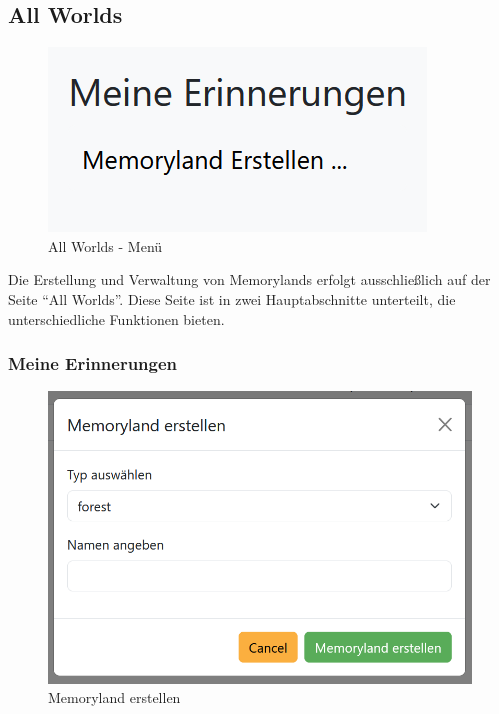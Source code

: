 \subsection{All Worlds}

\begin{figure}
    \centering
    \includegraphics[scale=0.7]{pics/all_worlds_teil1.PNG}
    \caption{All Worlds - Menü}
    \label{fig:all-worlds-menu}
\end{figure}

Die Erstellung und Verwaltung von Memorylands erfolgt ausschlie\ss{}lich auf der Seite ``All Worlds''. Diese Seite ist in zwei Hauptabschnitte unterteilt, die unterschiedliche Funktionen bieten.

\clearpage

\subsubsection{Meine Erinnerungen}


\begin{figure}
    \centering
    \includegraphics[scale=0.5]{pics/all_worlds_teil1_button.PNG}
    \caption{Memoryland erstellen}
    \label{fig:all-worlds-memoryland-erstellen}
\end{figure}

